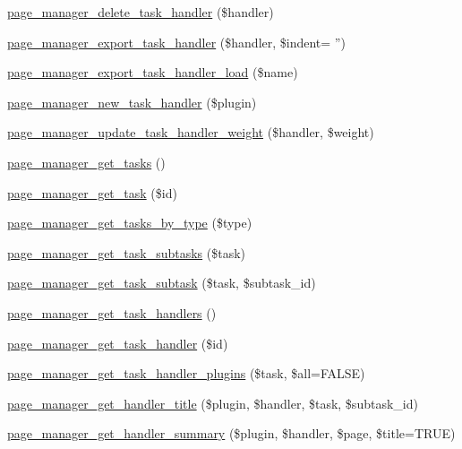 \begin{DoxyCompactItemize}
\hyperlink{page__manager_8module_a5c48ed8479bdab84952c4ef5d98cf414}{page\_\-manager\_\-delete\_\-task\_\-handler} (\$handler)
\item 
\hyperlink{page__manager_8module_af83383316a7ee971b7d06aedaa2dcff8}{page\_\-manager\_\-export\_\-task\_\-handler} (\$handler, \$indent= '')
\item 
\hyperlink{page__manager_8module_aa3fa7f3e10ba755a9845afab27d4da04}{page\_\-manager\_\-export\_\-task\_\-handler\_\-load} (\$name)
\item 
\hyperlink{page__manager_8module_a021f275296e873aa39120d2615292172}{page\_\-manager\_\-new\_\-task\_\-handler} (\$plugin)
\item 
\hyperlink{page__manager_8module_a95fb7f141656e679dc592eed96c71d6c}{page\_\-manager\_\-update\_\-task\_\-handler\_\-weight} (\$handler, \$weight)
\item 
\hyperlink{page__manager_8module_a11bb15144d50a80ca103073b361c2ec4}{page\_\-manager\_\-get\_\-tasks} ()
\item 
\hyperlink{page__manager_8module_a402f17e89478e21a1d0f4b128996e764}{page\_\-manager\_\-get\_\-task} (\$id)
\item 
\hyperlink{page__manager_8module_a6246786e5a4176c40200decc53458a77}{page\_\-manager\_\-get\_\-tasks\_\-by\_\-type} (\$type)
\item 
\hyperlink{page__manager_8module_aaf5c93fb26ab4eb49813ac07f4a49a01}{page\_\-manager\_\-get\_\-task\_\-subtasks} (\$task)
\item 
\hyperlink{page__manager_8module_a4134a18da6e1f9b2d6d3ddca2d77e23d}{page\_\-manager\_\-get\_\-task\_\-subtask} (\$task, \$subtask\_\-id)
\item 
\hyperlink{page__manager_8module_a6c34e1fe242a3d9c0b652a159ab5e065}{page\_\-manager\_\-get\_\-task\_\-handlers} ()
\item 
\hyperlink{page__manager_8module_a96c2796ab331b1eb6e052f468b4e7e11}{page\_\-manager\_\-get\_\-task\_\-handler} (\$id)
\item 
\hyperlink{page__manager_8module_a42b594f0f28dce3778bec96316a58678}{page\_\-manager\_\-get\_\-task\_\-handler\_\-plugins} (\$task, \$all=FALSE)
\item 
\hyperlink{page__manager_8module_a9b8d0b4e30a8e5e7111bf5a1784c629a}{page\_\-manager\_\-get\_\-handler\_\-title} (\$plugin, \$handler, \$task, \$subtask\_\-id)
\item 
\hyperlink{page__manager_8module_ae7a8599be04f7e436e1e1ab1cad2b67b}{page\_\-manager\_\-get\_\-handler\_\-summary} (\$plugin, \$handler, \$page, \$title=TRUE)

\end{DoxyCompactItemize}
